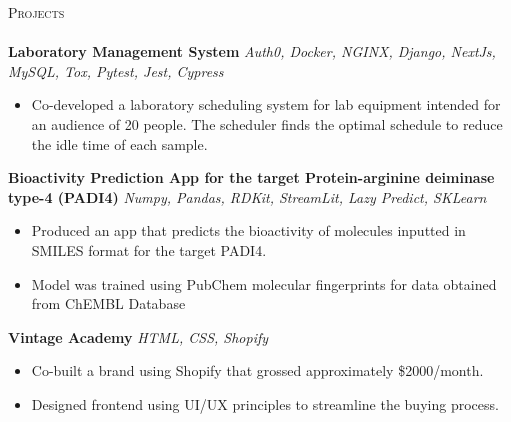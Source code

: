 \documentclass[a4paper]{article}
\newcommand{\lineunder} {
    \vspace*{-8pt} \\
    \hspace*{-18pt} \hrulefill \\
}
\newcommand{\header} [1] {
    {\hspace*{-18pt}\vspace*{6pt} \textsc{#1}}
    \vspace*{-6pt} \lineunder
}
\begin{document}


\header{Projects}
{\textbf{Laboratory Management System}} {\sl Auth0, Docker, NGINX, Django, NextJs, MySQL, Tox, Pytest, Jest, Cypress} \\
\vspace{-1mm}
\begin{itemize} \itemsep 1pt
	\item Co-developed a laboratory scheduling system for lab equipment intended for an audience of 20 people. The scheduler finds the optimal schedule to reduce the idle time of each sample.
\end{itemize}
\vspace*{1mm}


{\textbf{Bioactivity Prediction App for the target Protein-arginine deiminase type-4 (PADI4)}} {\sl Numpy, Pandas, RDKit, StreamLit, Lazy Predict, SKLearn} \\
\vspace{-1mm}
\begin{itemize} \itemsep 1pt
	\item Produced an app that predicts the bioactivity of molecules inputted in SMILES format for the target PADI4.
	\item Model was trained using PubChem molecular fingerprints for data obtained from ChEMBL Database
\end{itemize}
\vspace*{1mm}


{\textbf{Vintage Academy}} {\sl HTML, CSS, Shopify} \\
\vspace{-1mm}
\begin{itemize} \itemsep 1pt
	\item Co-built a brand using Shopify that grossed approximately \$2000/month.
	\item Designed frontend using UI/UX principles to streamline the buying process.\\
\end{itemize}
\vspace*{1mm}
\end{document}
